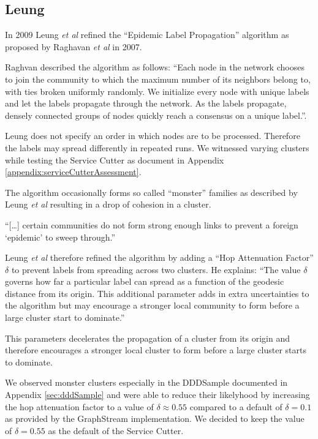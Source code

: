 \subsection{Leung}
\label{sec:monsterclusters}

In 2009 Leung \textit{et al}\cite{leung} refined the \enquote{Epidemic Label Propagation} algorithm as proposed by Raghavan \textit{et al}\cite{raghavan} in 2007. 

Raghvan described the algorithm as follows: \enquote{Each node in the network chooses to
join the community to which the maximum number of its neighbors belong to, with ties broken uniformly randomly. We initialize every node with unique labels and let the labels propagate through the network. As the labels propagate, densely connected groups of nodes quickly reach a consensus on a unique label.}\cite[p. 4]{raghavan}.

Leung does not specify an order in which nodes are to be processed. Therefore the labels may spread differently in repeated runs. We witnessed varying clusters while testing the Service Cutter as document in Appendix \ref{appendix:serviceCutterAssessment}.

The algorithm occasionally forms so called \enquote{monster} families as described by Leung \textit{et al} resulting in a drop of cohesion in a cluster. 

\enquote{[\dots] certain communities do not form strong enough links to prevent a foreign \enquote{epidemic} to sweep through.}\cite[p. 5]{leung}

Leung \textit{et al} therefore refined the algorithm by adding a \enquote{Hop Attenuation Factor} $\delta$ to prevent labels from spreading across two clusters. He explains: \enquote{The value $\delta$ governs how far a particular label can spread as a function of the geodesic distance from its origin. This additional parameter adds in extra uncertainties
to the algorithm but may encourage a stronger local community to form before a large cluster start to dominate.}\cite[p. 5]{leung}

This parameters decelerates the propagation of a cluster from its origin and therefore encourages a stronger local cluster to form before a large cluster starts to dominate.

We observed monster clusters especially in the DDDSample documented in Appendix \ref{sec:dddSample} and were able to reduce their likelyhood by increasing the hop attenuation factor to a value of $\delta \approx 0.55$ compared to a default of $ \delta = 0.1$ as provided by the GraphStream implementation. We decided to keep the value of $\delta = 0.55$ as the default of the Service Cutter.

